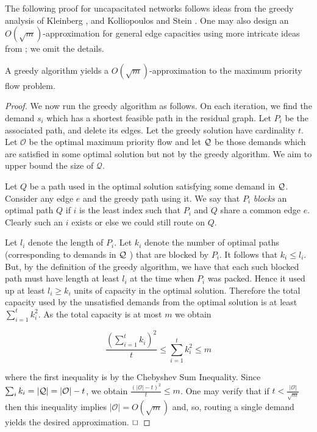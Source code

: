 \documentclass[12pt]{article}
\newcommand{\qed}{$\hfill{\Box}$}
\begin{document}
 The following proof for uncapacitated networks follows ideas from the greedy analysis of Kleinberg \cite{Kleinberg96},
 and Kolliopoulos and Stein \cite{kolliopoulos2004approximating}. One may also design an $O(\sqrt{m})$-approximation
 for general edge capacities using more intricate ideas from \cite{guruswami2003near}; we omit the details.
\begin{lemma}\label{lem:greedy-priority}
A greedy algorithm yields a $O(\sqrt{m})$-approximation to the  maximum priority flow problem.
\end{lemma}
\begin{proof}
We now run the greedy algorithm as follows. On each iteration, we find the demand $s_i$ which has a shortest feasible path
 in the residual graph. Let $P_i$ be the associated path, and delete
its edges. Let the greedy solution have cardinality $t$.
 Let $\mathcal{O}$ be the optimal maximum priority flow and
let ${\cal Q}$ be those demands which are satisfied in some optimal
solution but not by the greedy algorithm.
We aim to upper bound the size of $\mathcal{Q}$.

Let $Q$ be a path used in the optimal solution satisfying some demand in ${\cal Q}$.
Consider any edge $e$ and the greedy path using it.
 We say that $P_i$
{\em blocks} an optimal path $Q$ if $i$ is the least index such
that $P_i$ and $Q$ share a common edge $e$.
Clearly such an $i$ exists or else we could still route on $Q$.

Let $l_i$ denote the length of  $P_i$.
Let $k_i$ denote the number of optimal paths  (corresponding to
demands in ${\cal Q}$ ) that are blocked by $P_i$. It follows that
$k_i \le l_i$. But, by the definition of the greedy algorithm,
we have that each such blocked path must have length at least $l_i$
 at the time when $P_i$ was packed.
Hence it used up at least $l_i  \ge k_i$ units of capacity in the optimal solution.
Therefore the total capacity used by the unsatisfied demands from the
optimal solution is at least $\sum_{i=1}^t k_i^2$.
As the total capacity is at most $m$ we obtain


\begin{equation}
\label{bounding}
\frac{(\sum_{i=1}^t k_i)^2}{t} \leq
\sum_{i=1}^t k_i^2 \leq m
\end{equation}

\noindent
where the first inequality is by the Chebyshev Sum Inequality.
Since $\sum_{i} k_i = |{\cal Q}| = |{\cal O}| -t $, we obtain
$\frac{(|\mathcal{O}|-t)^2}{t} \leq m$. One may verify that if $t < \frac{|\mathcal{O}|}{\sqrt{m}}$ then this inequality implies
$|\mathcal{O}| = O(\sqrt{m})$ and, so, routing a single demand yields the desired approximation.
\qed
\end{proof}
\end{document}
